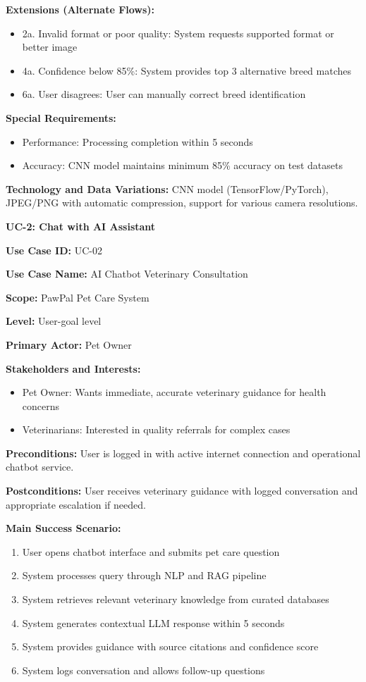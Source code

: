 \textbf{Extensions (Alternate Flows):}
\begin{itemize}
    \item 2a. Invalid format or poor quality: System requests supported format or better image
    \item 4a. Confidence below 85\%: System provides top 3 alternative breed matches
    \item 6a. User disagrees: User can manually correct breed identification
\end{itemize}

\textbf{Special Requirements:}
\begin{itemize}
    \item Performance: Processing completion within 5 seconds
    \item Accuracy: CNN model maintains minimum 85\% accuracy on test datasets
\end{itemize}

\textbf{Technology and Data Variations:} CNN model (TensorFlow/PyTorch), JPEG/PNG with automatic compression, support for various camera resolutions.

\textbf{UC-2: Chat with AI Assistant}

\textbf{Use Case ID:} UC-02

\textbf{Use Case Name:} AI Chatbot Veterinary Consultation

\textbf{Scope:} PawPal Pet Care System

\textbf{Level:} User-goal level

\textbf{Primary Actor:} Pet Owner

\textbf{Stakeholders and Interests:}
\begin{itemize}
    \item Pet Owner: Wants immediate, accurate veterinary guidance for health concerns
    \item Veterinarians: Interested in quality referrals for complex cases
\end{itemize}

\textbf{Preconditions:} User is logged in with active internet connection and operational chatbot service.

\textbf{Postconditions:} User receives veterinary guidance with logged conversation and appropriate escalation if needed.

\textbf{Main Success Scenario:}
\begin{enumerate}
    \item User opens chatbot interface and submits pet care question
    \item System processes query through NLP and RAG pipeline
    \item System retrieves relevant veterinary knowledge from curated databases
    \item System generates contextual LLM response within 5 seconds
    \item System provides guidance with source citations and confidence score
    \item System logs conversation and allows follow-up questions
\end{enumerate}

